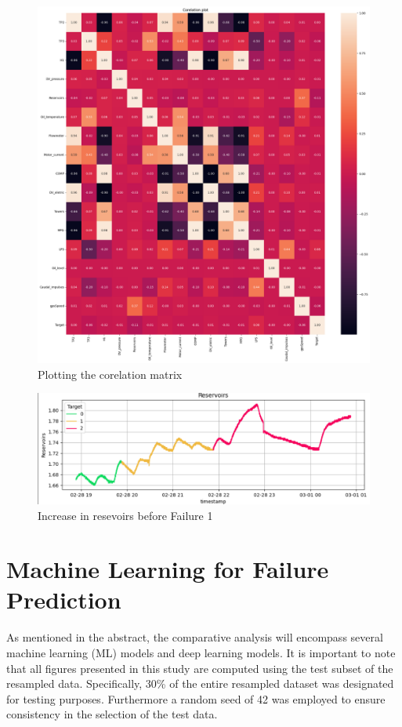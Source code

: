 \documentclass{article}
\begin{document}
\begin{figure}
    \centering
    \includegraphics[width=1\linewidth]{cm.png}
    \caption{Plotting the corelation matrix}
    \label{fig:Corealtions}
\end{figure}

\begin{figure}
    \centering
    \includegraphics[width=1\linewidth]{EDA_Res.png}
    \caption{Increase in resevoirs before Failure 1}
    \label{fig:enter-label}
\end{figure}

\section{Machine Learning for Failure Prediction}

As mentioned in the abstract, the comparative analysis will encompass several machine learning (ML) models and deep learning models. It is important to note that all figures presented in this study are computed using the test subset of the resampled data. Specifically, 30\% of the entire resampled dataset was designated for testing purposes. Furthermore a random seed of 42 was employed to ensure consistency in the selection of the test data. \\
\end{document}
